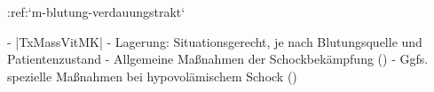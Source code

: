 %
:ref:`m-blutung-verdauungstrakt`%
\begin{itemize}
  -   |TxMassVitMK|
    -   Lagerung:
    Situationsgerecht, je nach Blutungsquelle und
    Patientenzustand
  -   Allgemeine Maßnahmen der Schockbekämpfung
  ()
  -   Ggfs. spezielle Maßnahmen bei hypovolämischem Schock
  ()
\end{itemize}